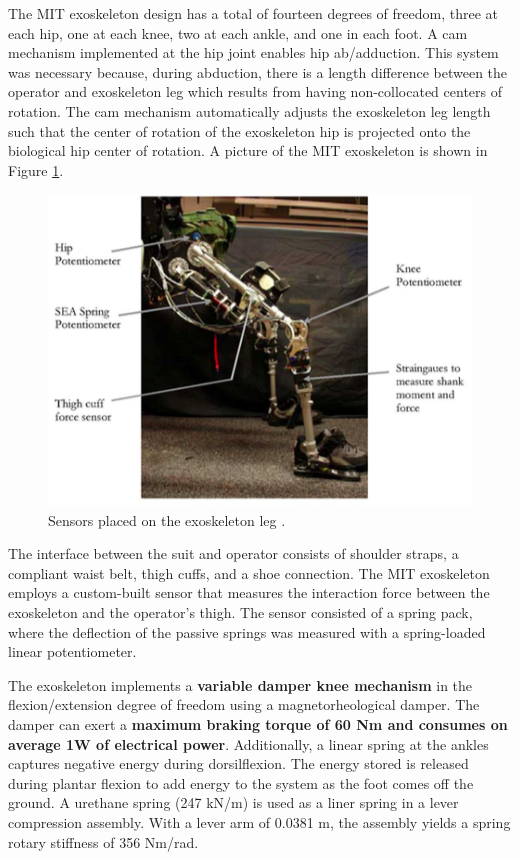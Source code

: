 \begin{refsection}
 The MIT exoskeleton design has a total of fourteen degrees of freedom, three at each hip, one at each knee, two at each ankle, and one in each foot.  A cam mechanism implemented at the hip joint enables hip ab/adduction.  This system was necessary because, during abduction, there is a length difference between the operator and exoskeleton leg which results from having non-collocated centers of rotation.  The cam mechanism automatically adjusts the exoskeleton leg length such that the center of rotation of the exoskeleton hip is projected onto the biological hip center of rotation.  A picture of the MIT exoskeleton is shown in Figure \ref{fig:MITsuit}.
 \begin{figure}[thpb]
\centering
\includegraphics[width=3.in]{exos/figs/MIT/MITsuit}
  \caption{ Sensors placed on the exoskeleton leg \cite{mit_control_2006}.}
 \label{fig:MITsuit}   
 \end{figure} 
% 
 The interface between the suit and operator consists of shoulder straps, a compliant waist belt, thigh cuffs, and a shoe connection.  The MIT exoskeleton employs a custom-built sensor that measures the interaction force between the exoskeleton and the operator's thigh. The sensor consisted of a spring pack, where the deflection of the passive springs was measured with a spring-loaded linear potentiometer.  

 The exoskeleton implements a {\bf variable damper knee mechanism} in the flexion/extension degree of freedom using a magnetorheological damper.  The damper can exert a {\bf maximum braking torque of 60 Nm and consumes on average 1W of electrical power}.  Additionally, a linear spring at the ankles captures negative energy during dorsilflexion.  The energy stored is released during plantar flexion to add energy to the system as the foot comes off the ground. A urethane spring (247 kN/m) is used as a liner spring in a lever compression assembly.  With a lever arm of 0.0381 m, the assembly yields a spring rotary stiffness of 356 Nm/rad. 
 

\end{refsection}
